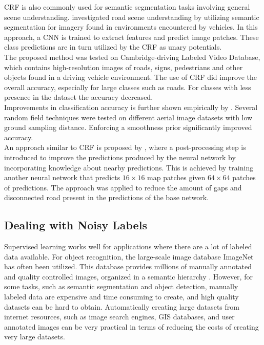 \ac{CRF} is also commonly used for semantic segmentation tasks involving general scene understanding. \cite{LeCun_semantic} investigated road scene understanding by utilizing semantic segmentation for imagery found in environments encountered by vehicles. In this approach, a \ac{CNN} is trained to extract features and predict image patches. These class predictions are in turn utilized by the \ac{CRF} as unary potentials.\\

The proposed method was tested on Cambridge-driving Labeled Video Database, which contains high-resolution images of roads, signs, pedestrians and other objects found in a driving vehicle environment. The use of \ac{CRF} did improve the overall accuracy, especially for large classes such as roads. For classes with less presence in the dataset the accuracy decreased.\\

Improvements in classification accuracy is further shown empirically by \cite{Schindler_random_field_overview}. Several random field techniques were tested on different aerial image datasets with low ground sampling distance. Enforcing a smoothness prior significantly improved accuracy. \\

An approach similar to \ac{CRF} is proposed by \cite{Mnih_roads_high_res_aerial_images}, where a post-processing step is introduced to improve the predictions produced by the neural network by incorporating knowledge about nearby predictions. This is achieved by training another neural network that predicts $16 \times 16$ map patches given $64 \times 64$ patches of predictions. The approach was applied to reduce the amount of gaps and disconnected road present in the predictions of the base network. 

\subsection{Dealing with Noisy Labels}
Supervised learning works well for applications where there are a lot of labeled data available. For object recognition, the large-scale image database ImageNet has often been utilized. This database provides millions of manually annotated and quality controlled images, organized in a semantic hierarchy \citep{Deng_imagenet}. However, for some tasks, such as semantic segmentation and object detection, manually labeled data are expensive and time consuming to create, and high quality datasets can be hard to obtain. Automatically creating large datasets from internet resources, such as image search engines, \ac{GIS} databases, and user annotated images can be very practical in terms of reducing the costs of creating very large datasets. \\

